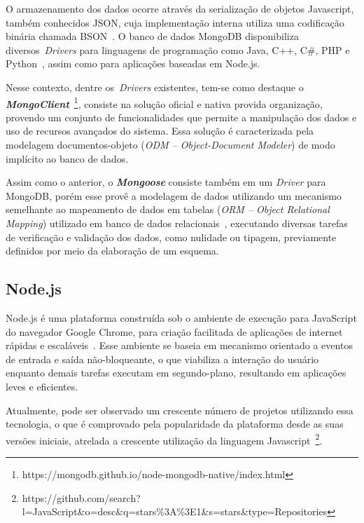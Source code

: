 \documentclass[12pt]{article}
\begin{document}
O armazenamento dos dados ocorre através da serialização de objetos Javascript, também conhecidos JSON, cuja implementação interna utiliza uma codificação binária chamada BSON~\cite{bson}. O banco de dados MongoDB disponibiliza diversos~\emph{Drivers} para linguagens de programação como Java, C++, C\#, PHP e Python~\cite{lutu2015big}, assim como para aplicações baseadas em Node.js.

Nesse contexto, dentre os~\emph{Drivers} existentes, tem-se como destaque o \textbf{\textit{MongoClient}}~\footnote{https://mongodb.github.io/node-mongodb-native/index.html}, consiste na solução oficial e nativa provida organização, provendo um conjunto de funcionalidades que permite a manipulação dos dados e uso de recursos avançados do sistema. Essa solução é caracterizada pela modelagem documentos-objeto (\emph{ODM -- Object-Document Modeler}) de modo implícito ao banco de dados.

Assim como o anterior, o \textbf{\textit{Mongoose}} consiste também em um \emph{Driver} para MongoDB, porém esse provê a modelagem de dados utilizando um mecanismo semelhante ao mapeamento de dados em tabelas (\emph{ORM -- Object Relational Mapping}) utilizado em banco de dados relacionais~\cite{mardan2014boosting}, executando diversas tarefas de verificação e validação dos dados, como nulidade ou tipagem, previamente definidos por meio da elaboração de um esquema.

\subsection{Node.js}
\label{subsection:nodejs}

Node.js é uma plataforma construída sob o ambiente de execução para JavaScript do navegador Google Chrome, para criação facilitada de aplicações de internet rápidas e escaláveis~\cite{nodejs}. Esse ambiente se baseia em mecanismo orientado a eventos de entrada e saída não-bloqueante, o que viabiliza a interação do usuário enquanto demais tarefas executam em segundo-plano, resultando em aplicações leves e eficientes.

Atualmente, pode ser observado um crescente número de projetos utilizando essa tecnologia, o que é comprovado pela popularidade da plataforma desde as suas versões iniciais, atrelada a crescente utilização da linguagem Javascript~\footnote{https://github.com/search?l=JavaScript\&o=desc\&q=stars\%3A\%3E1\&s=stars\&type=Repositories}.

\end{document}
